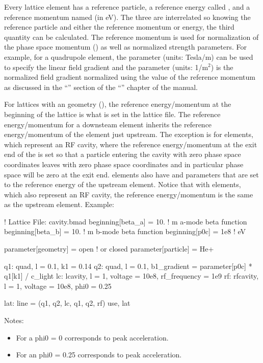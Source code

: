 \documentclass{hitec}     %
\begin{document}
Every lattice element has a reference particle, a reference energy called , and a
reference momentum named  (in eV). The three are interrelated so knowing the reference
particle and either the reference momentum or energy, the third quantity can be calculated. The
reference momentum is used for normalization of the phase space momentum ()
as well as normalized strength parameters. For example, for a quadrupole element, the
 parameter (units: Tesla/m) can be used to specify the linear field gradient and the
 parameter (units: 1/m$^2$) is the normalized field gradient normalized using the value of
the reference momentum as discussed in the ``'' section of the
``'' chapter of the \bmad manual.

For lattices with an  geometry (), the reference energy/momentum at the
beginning of the lattice is what is set in the lattice file. The reference energy/momentum for a
downsteam element inherits the reference energy/momentum of the element just upstream. The exception
is for  elements, which represent an RF cavity, where the reference energy/momentum at
the exit end of the  is set so that a particle entering the cavity with zero phase space
coordinates leaves with zero phase space coordinates and in particular phase space  will be
zero at the exit end.  elements also have  and  parameters
that are set to the reference energy of the upstream element. Notice that with 
elements, which also represent an RF cavity, the reference energy/momentum is the same as the
upstream element. Example:
\begin{code}
! Lattice File: cavity.bmad
beginning[beta_a] = 10.   ! m  a-mode beta function
beginning[beta_b] = 10.   ! m  b-mode beta function
beginning[p0c] = 1e8   ! eV  

parameter[geometry] = open      ! or closed
parameter[particle] = He+ 

q1: quad, l = 0.1, k1 = 0.14
q2: quad, l = 0.1, b1_gradient = parameter[p0c] * q1[k1] / c_light
lc: lcavity, l = 1, voltage = 10e8, rf_frequency = 1e9
rf: rfcavity, l = 1, voltage = 10e8, phi0 = 0.25

lat: line = (q1, q2, lc, q1, q2, rf)
use, lat
\end{code}

Notes:
\vspace{-5 pt}
\begin{itemize}
\item For a  phi0 = 0 corresponds to peak acceleration.
\item For an  phi0 = 0.25 corresponds to peak acceleration.
\end{itemize}
\end{document}
